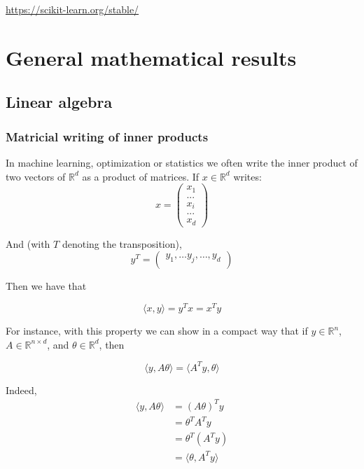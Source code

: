 \documentclass[
10pt, %
a4paper, %
oneside, %
headinclude,footinclude, %
BCOR5mm, %
]{scrartcl}
\begin{document}
\url{https://scikit-learn.org/stable/} 

\section{\large\color{Blue}General mathematical results}

\subsection{\large\color{MidnightBlue}Linear algebra}

\subsubsection{\large\color{Periwinkle}Matricial writing of inner products}
\label{ssec:linalg}

In machine learning, optimization or statistics we often write the inner product of two vectors of $ \mathbb{R}^d$ as a product of matrices. If $x\in \mathbb{R}^d$ writes:
\begin{equation*}
x=\begin{pmatrix}
x_{1}\\
...\\
x_{i}\\
...\\
x_{d}
\end{pmatrix}
\end{equation*}

And (with $T$ denoting the transposition),
\begin{equation*}
y^T=\begin{pmatrix}
y_{1}, \dots y_j, \dots, y_d\\
\end{pmatrix}
\end{equation*}

Then we have that

\begin{equation*}
    \langle x, y \rangle = y^Tx=x^Ty
\end{equation*}

For instance, with this property we can show in a compact way that if $y\in \mathbb{R}^n$, $A\in \mathbb{R}^{n\times d}$, and $\theta\in \mathbb{R}^d$, then

\begin{equation*}
    \langle y, A\theta\rangle = \langle A^Ty, \theta\rangle
\end{equation*}

Indeed, 
\begin{equation*}
    \begin{aligned}
	\langle y, A\theta\rangle &= (A\theta)^Ty\\
	&= \theta^TA^Ty\\
	&=\theta^T(A^Ty)\\
	&=\langle \theta, A^Ty\rangle
    \end{aligned}
\end{equation*}
\end{document}
